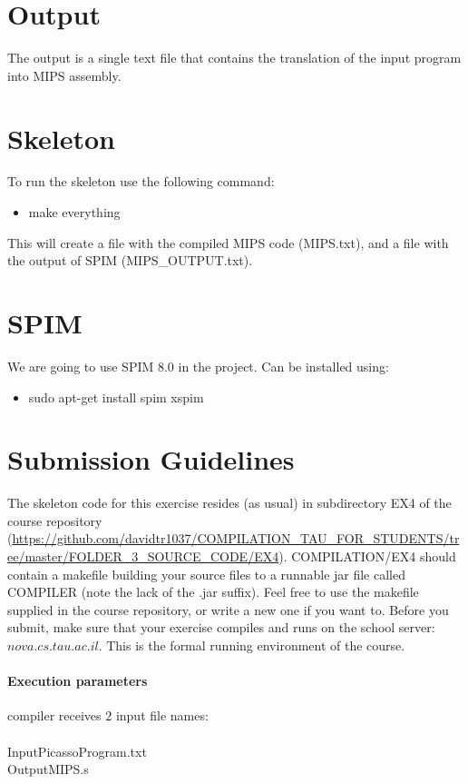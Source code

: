 \documentclass{article}
\begin{document}
\section{Output}
The output is a single text file that contains the
translation of the input program into MIPS assembly.

\section{Skeleton}
To run the skeleton use the following command:
\begin{itemize}
\item make everything
\end{itemize}
This will create a file with the compiled MIPS code (MIPS.txt), and a file with the output of SPIM (MIPS\_OUTPUT.txt).

\section{SPIM}
We are going to use SPIM 8.0 in the project.
Can be installed using:
\begin{itemize}
\item sudo apt-get install spim xspim
\end{itemize}


\section{Submission Guidelines}
The skeleton code for this exercise resides (as usual)
in subdirectory EX4 of the course repository
(\url{https://github.com/davidtr1037/COMPILATION_TAU_FOR_STUDENTS/tree/master/FOLDER_3_SOURCE_CODE/EX4}).
COMPILATION/EX4 should contain a makefile building your source files to a
runnable jar file called COMPILER (note the lack of the .jar suffix).
Feel free to use the makefile supplied in the course repository,
or write a new one if you want to. 
Before you submit, make sure that your exercise compiles and runs
on the school server: $nova.cs.tau.ac.il$.
This is the formal running environment of the course.

\paragraph{Execution parameters}
compiler receives $2$ input file names:\\ \\
InputPicassoProgram.txt\\
OutputMIPS.s
\end{document}
